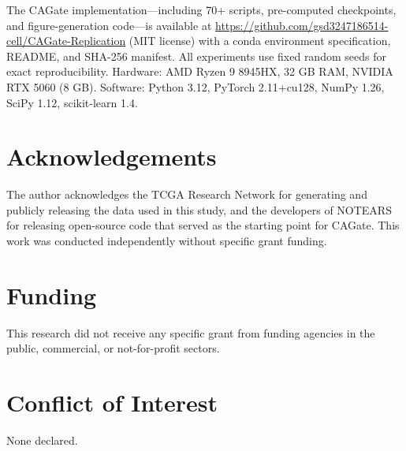 \documentclass[12pt,a4paper]{article}
\begin{document}
The CAGate implementation---including 70+ scripts, pre-computed checkpoints, and figure-generation code---is available at \url{https://github.com/gsd3247186514-cell/CAGate-Replication} (MIT license) with a conda environment specification, README, and SHA-256 manifest. All experiments use fixed random seeds for exact reproducibility. Hardware: AMD Ryzen 9 8945HX, 32 GB RAM, NVIDIA RTX 5060 (8 GB). Software: Python 3.12, PyTorch 2.11+cu128, NumPy 1.26, SciPy 1.12, scikit-learn 1.4.













\section*{Acknowledgements}




The author acknowledges the TCGA Research Network for generating and publicly releasing the data used in this study, and the developers of NOTEARS for releasing open-source code that served as the starting point for CAGate. This work was conducted independently without specific grant funding.









\section*{Funding}




This research did not receive any specific grant from funding agencies in the public, commercial, or not-for-profit sectors.









\section*{Conflict of Interest}




None declared.
\end{document}
